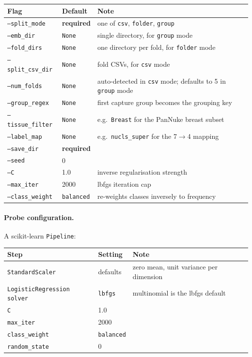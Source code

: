 \documentclass[10pt,a4paper]{article}
\newcommand{\req}{\textcolor{eosin}{\textbf{required}}}
\begin{document}
\begin{longtable}{@{}p{4.0cm}p{2.8cm}p{8.8cm}@{}}
\toprule
\textbf{Flag} & \textbf{Default} & \textbf{Note} \\
\midrule \endhead
\texttt{--split\_mode} & \req & one of \texttt{csv}, \texttt{folder}, \texttt{group} \\
\texttt{--emb\_dir} & \texttt{None} & single directory, for \texttt{group} mode \\
\texttt{--fold\_dirs} & \texttt{None} & one directory per fold, for \texttt{folder} mode \\
\texttt{--split\_csv\_dir} & \texttt{None} & fold CSVs, for \texttt{csv} mode \\
\texttt{--num\_folds} & \texttt{None} & auto-detected in \texttt{csv} mode; defaults to 5 in \texttt{group} mode \\
\texttt{--group\_regex} & \texttt{None} & first capture group becomes the grouping key \\
\texttt{--tissue\_filter} & \texttt{None} & e.g.\ \texttt{Breast} for the PanNuke breast subset \\
\texttt{--label\_map} & \texttt{None} & e.g.\ \texttt{nucls\_super} for the 7$\rightarrow$4 mapping \\
\texttt{--save\_dir} & \req & \\
\texttt{--seed} & 0 & \\
\texttt{--C} & 1.0 & inverse regularisation strength \\
\texttt{--max\_iter} & 2000 & lbfgs iteration cap \\
\texttt{--class\_weight} & \texttt{balanced} & re-weights classes inversely to frequency \\
\bottomrule
\end{longtable}

\paragraph{Probe configuration.} A scikit-learn \texttt{Pipeline}:

\begin{longtable}{@{}p{4.6cm}p{4.2cm}p{6.8cm}@{}}
\toprule
\textbf{Step} & \textbf{Setting} & \textbf{Note} \\
\midrule \endhead
\texttt{StandardScaler} & defaults & zero mean, unit variance per dimension \\
\texttt{LogisticRegression} \texttt{solver} & \texttt{lbfgs} & multinomial is the lbfgs default \\
\quad \texttt{C} & 1.0 & \\
\quad \texttt{max\_iter} & 2000 & \\
\quad \texttt{class\_weight} & \texttt{balanced} & \\
\quad \texttt{random\_state} & 0 & \\
\bottomrule
\end{longtable}
\end{document}
